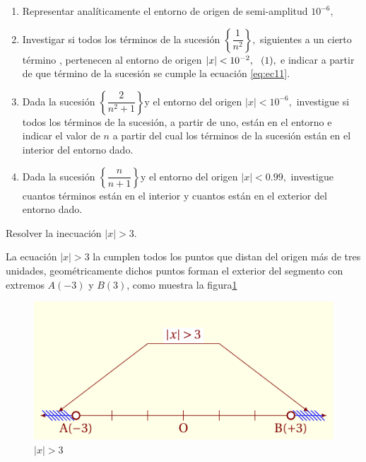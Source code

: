 \documentclass[oneside,english,spanish,2m,twoside,svgnames,x11names,HTML,twoside,12pt]{libro-matua}\usepackage[]{graphicx}\usepackage[]{color}
\newcommand{\val}[1]{\left|#1\right|}
\newcommand{\inline}{\refstepcounter{equation}~~\mbox{(\theequation)}}%
\begin{document}
\begin{ejercicios}[]
\begin{enumerate}
\item Representar analíticamente el entorno de origen de semi-amplitud $10^{-6},$
\item Investigar si todos los términos de la sucesión $\left\{ \dfrac{1}{n^{2}}\right\} ,$
siguientes a un cierto término , pertenecen al entorno de origen $\val{x}<10^{-2},\inline\text{\label{eq:ec11}},$
e indicar a partir de que término de la sucesión se cumple la ecuación
\ref{eq:ec11}. 
\item Dada la sucesión $\left\{ \dfrac{2}{n^{2}+1}\right\} $y el entorno
del origen $\val{x}<10^{-6},$ investigue si todos los términos de
la sucesión, a partir de uno, están en el entorno e indicar el valor
de $n$ a partir del cual los términos de la sucesión están en el
interior del entorno dado. 
\item Dada la sucesión $\left\{ \dfrac{n}{n+1}\right\} $y el entorno del
origen $\val{x}<0.99,$ investigue cuantos términos están en el interior
y cuantos están en el exterior del entorno dado.
\end{enumerate}
\end{ejercicios}

\begin{ejemplo}

Resolver la inecuación $\val{x}>3.$ 

\end{ejemplo}

\sol La ecuación $\val{x}>3$ la cumplen todos los puntos que distan
del origen más de tres unidades, geométricamente dichos puntos forman
el exterior del segmento con extremos $A\left(-3\right)$ y $B\left(3\right)$,
como muestra la figura\ref{fig:cal_lim4} 
\begin{figure}[H]
\centering\includegraphics{6_home_antalcides_MEGA_calculo_I_libro_pdf_cal_lim4.pdf}\caption{$\val{x}> 3$}\label{fig:cal_lim4}
\end{figure}
\fin
\end{document}
